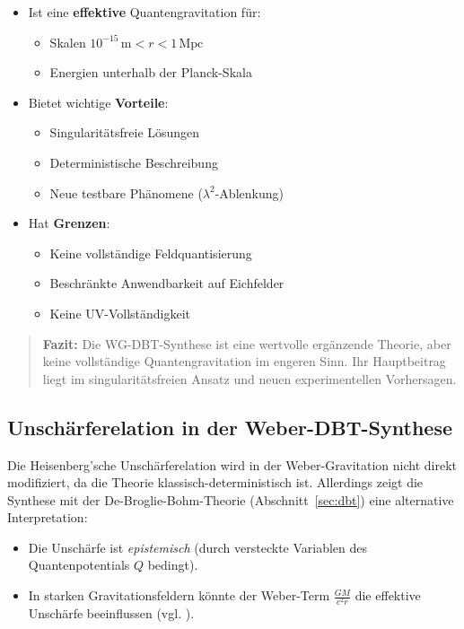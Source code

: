 \begin{itemize}
\item Ist eine \textbf{effektive} Quantengravitation für:
\begin{itemize}
\item Skalen $10^{-15}\,\text{m} < r < 1\,\text{Mpc}$
\item Energien unterhalb der Planck-Skala
\end{itemize}

\item Bietet wichtige \textbf{Vorteile}:
\begin{itemize}
\item Singularitätsfreie Lösungen
\item Deterministische Beschreibung
\item Neue testbare Phänomene ($\lambda^2$-Ablenkung)
\end{itemize}

\item Hat \textbf{Grenzen}:
\begin{itemize}
\item Keine vollständige Feldquantisierung
\item Beschränkte Anwendbarkeit auf Eichfelder
\item Keine UV-Vollständigkeit
\end{itemize}
\end{itemize}

\begin{quote}
\textbf{Fazit:} Die WG-DBT-Synthese ist eine wertvolle ergänzende Theorie, aber keine vollständige Quantengravitation im engeren Sinn. Ihr Hauptbeitrag liegt im
singularitätsfreien Ansatz und neuen experimentellen Vorhersagen.
\end{quote}

\subsection{Unschärferelation in der Weber-DBT-Synthese}
Die Heisenberg’sche Unschärferelation wird in der Weber-Gravitation nicht direkt modifiziert, da die Theorie klassisch-deterministisch ist. Allerdings zeigt die Synthese mit der
De-Broglie-Bohm-Theorie (Abschnitt~\ref{sec:dbt}) eine alternative Interpretation:
\begin{itemize}
    \item Die Unschärfe ist \textit{epistemisch} (durch versteckte Variablen des Quantenpotentials $Q$ bedingt).
    \item In starken Gravitationsfeldern könnte der Weber-Term $\frac{GM}{c^2 r}$ die effektive Unschärfe beeinflussen (vgl. \cite{bohm1952}).
\end{itemize}


